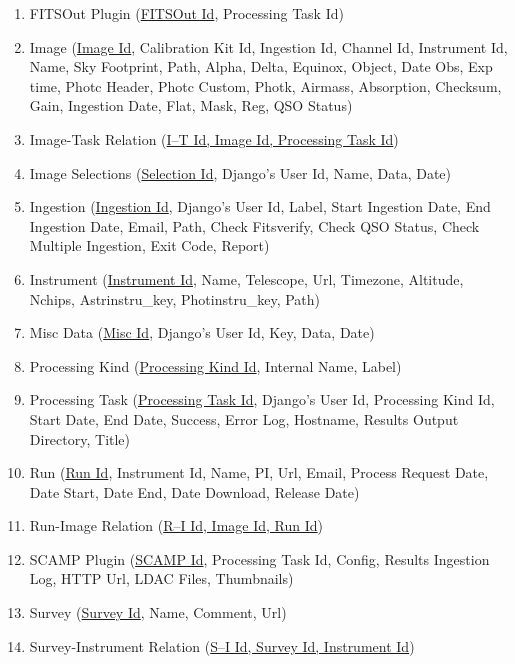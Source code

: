 \documentclass[twoside,a4paper]{article}
\begin{document}
\begin{enumerate}
\item FITSOut Plugin (\underline{FITSOut Id}, Processing Task Id)
\item Image (\underline{Image Id}, Calibration Kit Id, Ingestion Id, Channel Id, Instrument Id, Name, Sky Footprint, Path, Alpha, Delta, Equinox, Object, Date Obs, Exp time, Photc Header, Photc Custom, Photk, Airmass, Absorption, Checksum, Gain, Ingestion Date, Flat, Mask, Reg, QSO Status)
\item Image-Task Relation (\underline{I--T Id, Image Id, Processing Task Id}) 
\item Image Selections (\underline{Selection Id}, Django's User Id, Name, Data, Date)
\item Ingestion (\underline{Ingestion Id}, Django's User Id, Label, Start Ingestion Date, End Ingestion Date, Email, Path, Check Fitsverify, Check QSO Status, Check Multiple Ingestion, Exit Code, Report)
\item Instrument (\underline{Instrument Id}, Name, Telescope, Url, Timezone, Altitude, Nchips, Astrinstru\_key, Photinstru\_key, Path)
\item Misc Data (\underline{Misc Id}, Django's User Id, Key, Data, Date)
\item Processing Kind (\underline{Processing Kind Id}, Internal Name, Label)
\item Processing Task (\underline{Processing Task Id}, Django's User Id, Processing Kind Id, Start Date, End Date, Success, Error Log, Hostname, Results Output Directory, Title)
\item Run (\underline{Run Id}, Instrument Id, Name, PI, Url, Email, Process Request Date, Date Start, Date End, Date Download, Release Date)
\item Run-Image Relation (\underline{R--I Id, Image Id, Run Id}) 
\item SCAMP Plugin (\underline{SCAMP Id}, Processing Task Id, Config, Results Ingestion Log, HTTP Url, LDAC Files, Thumbnails)
\item Survey (\underline{Survey Id}, Name, Comment, Url)
\item Survey-Instrument Relation (\underline{S--I Id, Survey Id, Instrument Id}) 
\end{enumerate}
\end{document}
